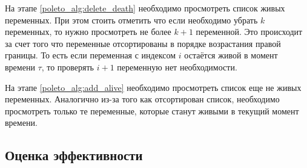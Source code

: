 На этапе \ref{poleto_alg:delete_death} необходимо просмотреть список живых переменных. При этом стоить отметить
что если необходимо убрать $k$ переменных, то нужно просмотреть не более $k+1$ переменной. Это происходит за счет
того что переменные отсортированы в порядке возрастания правой границы. То есть если переменная с индексом $i$
остаётся живой в момент времени $\tau$, то проверять $i + 1$ переменную нет необходимости.

На этапе \ref{poleto_alg:add_alive} необходимо просмотреть список еще не живых переменных. Аналогично
из-за того как отсортирован список, необходимо просмотреть только те переменные, которые станут живыми
в текущий момент времени.

\subsection{Оценка эффективности}

{} %



